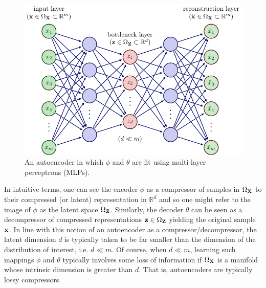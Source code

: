 \documentclass[11pt]{article}
\begin{document}
\begin{figure}[t]
    \centering
    \includegraphics[width=\columnwidth]{./figures/generative_models/AE_autoencoder.pdf}
    \caption{An autoencoder in which $\phi$ and $\theta$ are fit using multi-layer perceptrons (MLPs).}
    \label{fig:autoencoder}
\end{figure}

In intuitive terms, one can see the encoder $\phi$ as a compressor of samples in $\Omega_{\mathbf{X}}$ to their compressed (or latent) representation in $\mathbb{R}^d$ and so one might refer to the image of $\phi$ as the latent space $\Omega_{\mathbf{Z}}$. Similarly, the decoder $\theta$ can be seen as a decompressor of compressed representations $\mathbf{z}\in\Omega_{\mathbf{Z}}$ yielding the original sample $\mathbf{x}$. In line with this notion of an autoencoder as a compressor/decompressor, the latent dimension $d$ is typically taken to be far smaller than the dimension of the distribution of interest, i.e. $d\ll m$. Of course, when $d\ll m$, learning such mappings $\phi$ and $\theta$ typically involves some loss of information if $\Omega_{\mathbf{X}}$ is a manifold whose intrinsic dimension is greater than $d$. That is, autoencoders are typically lossy compressors.
\end{document}
